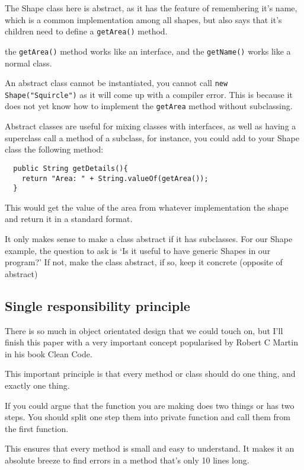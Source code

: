 \documentclass{article}
\begin{document}
  The Shape class here is abstract, as it has the feature of remembering it's
  name, which is a common implementation among all shapes, but also says that
  it's children need to define a \texttt{getArea()} method.

  the \texttt{getArea()} method works like an interface, and the \texttt{getName()} works like a
  normal class.

  An abstract class cannot be instantiated, you cannot call \texttt{new Shape("Squircle")}
  as it will come up with a compiler error. This is because it does not yet know
  how to implement the \texttt{getArea} method without subclassing.

  Abstract classes are useful for mixing classes with interfaces, as well as having
  a superclass call a method of a subclass, for instance, you could add to your Shape
  class the following method:

  \begin{verbatim}
  public String getDetails(){
    return "Area: " + String.valueOf(getArea());
  }
  \end{verbatim}

  This would get the value of the area from whatever implementation the shape
  and return it in a standard format.

  It only makes sense to make a class abstract if it has subclasses. For our
  Shape example, the question to ask is `Is it useful to have generic Shapes
  in our program?' If not, make the class abstract, if so, keep it concrete
  (opposite of abstract)

  \subsection*{Single responsibility principle}
  There is so much in object orientated design that we could touch on, but I'll
  finish this paper with a very important concept popularised by Robert C Martin
  in his book Clean Code.

  This important principle is that every method or class should do one thing,
  and exactly one thing.

  If you could argue that the function you are making does two things or has two
  steps. You should split one step them into private function and call them 
  from the first function.

  This ensures that every method is small and easy to understand. It makes it
  an absolute breeze to find errors in a method that's only 10 lines long.
\end{document}
